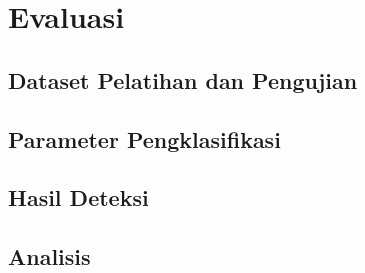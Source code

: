 \chapter{Evaluasi}
\label{bab:04}


	\section{Dataset Pelatihan dan Pengujian}
	\label{bab:04:dataset}
	

	\section{Parameter Pengklasifikasi}
	\label{bab:04:parameter}
	

	\section{Hasil Deteksi}
	\label{bab:04:hasil_deteksi}
	

	\section{Analisis}
	

